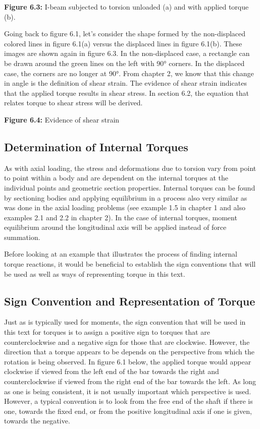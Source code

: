 \documentclass[
  letterpaper,
  DIV=11,
  numbers=noendperiod]{scrreprt}
\begin{document}
\textbf{Figure 6.3:} I-beam subjected to torsion unloaded (a) and with
applied torque (b).

Going back to figure 6.1, let's consider the shape formed by the
non-displaced colored lines in figure 6.1(a) versus the displaced lines
in figure 6.1(b). These images are shown again in figure 6.3. In the
non-displaced case, a rectangle can be drawn around the green lines on
the left with 90° corners. In the displaced case, the corners are no
longer at 90°. From chapter 2, we know that this change in angle is the
definition of shear strain. The evidence of shear strain indicates that
the applied torque results in shear stress. In section 6.2, the equation
that relates torque to shear stress will be derived.

\textbf{Figure 6.4:} Evidence of shear strain

\subsection{Determination of Internal
Torques}\label{determination-of-internal-torques}

As with axial loading, the stress and deformations due to torsion vary
from point to point within a body and are dependent on the internal
torques at the individual points and geometric section properties.
Internal torques can be found by sectioning bodies and applying
equilibrium in a process also very similar as was done in the axial
loading problems (see example 1.5 in chapter 1 and also examples 2.1 and
2.2 in chapter 2). In the case of internal torques, moment equilibrium
around the longitudinal axis will be applied instead of force summation.

Before looking at an example that illustrates the process of finding
internal torque reactions, it would be beneficial to establish the sign
conventions that will be used as well as ways of representing torque in
this text.

\subsection{Sign Convention and Representation of
Torque}\label{sign-convention-and-representation-of-torque}

Just as is typically used for moments, the sign convention that will be
used in this text for torques is to assign a positive sign to torques
that are counterclockwise and a negative sign for those that are
clockwise. However, the direction that a torque appears to be depends on
the perspective from which the rotation is being observed. In figure 6.1
below, the applied torque would appear clockwise if viewed from the left
end of the bar towards the right and counterclockwise if viewed from the
right end of the bar towards the left. As long as one is being
consistent, it is not usually important which perspective is used.
However, a typical convention is to look from the free end of the shaft
if there is one, towards the fixed end, or from the positive
longitudinal axis if one is given, towards the negative.
\end{document}
